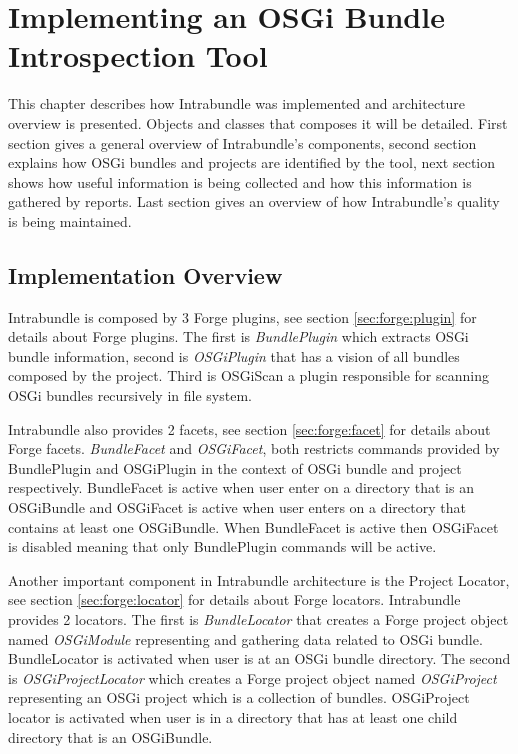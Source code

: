 \chapter{Implementing an OSGi Bundle Introspection Tool}
This chapter describes how Intrabundle was implemented and architecture overview is presented. Objects and classes that composes it will be detailed. First section gives a general overview of Intrabundle's components, second section explains how OSGi bundles and projects are identified by the tool, next section shows how useful information is being collected and how this information is gathered by reports. Last section gives an overview of how Intrabundle's quality is being maintained.   

\section{Implementation Overview}

Intrabundle is composed by 3 Forge plugins, see section \ref{sec:forge:plugin} for details about Forge plugins. The first is \emph{BundlePlugin} which extracts OSGi bundle information, second is \emph{OSGiPlugin} that has a vision of all bundles composed by the project. Third is OSGiScan a plugin responsible for scanning OSGi bundles recursively in file system. 


Intrabundle also provides 2 facets, see section \ref{sec:forge:facet} for details about Forge facets. \emph{BundleFacet} and \emph{OSGiFacet}, both restricts commands provided by BundlePlugin and OSGiPlugin in the context of OSGi bundle and project respectively. BundleFacet is active when user enter on a directory that is an OSGiBundle and OSGiFacet is active when user enters on a directory that contains at least one OSGiBundle. When BundleFacet is active then OSGiFacet is disabled meaning that only BundlePlugin commands will be active. 

Another important component in Intrabundle architecture is the Project Locator, see section \ref{sec:forge:locator} for details about Forge locators. Intrabundle provides 2 locators. The first is \emph{BundleLocator} that creates a Forge project object named \emph{OSGiModule} representing and gathering data related to OSGi bundle. BundleLocator is activated when user is at an OSGi bundle directory. The second is \emph{OSGiProjectLocator} which creates a Forge project object named \emph{OSGiProject} representing an OSGi project which is a collection of bundles. OSGiProject locator is activated when user is in a directory that has at least one child directory that is an OSGiBundle.          

